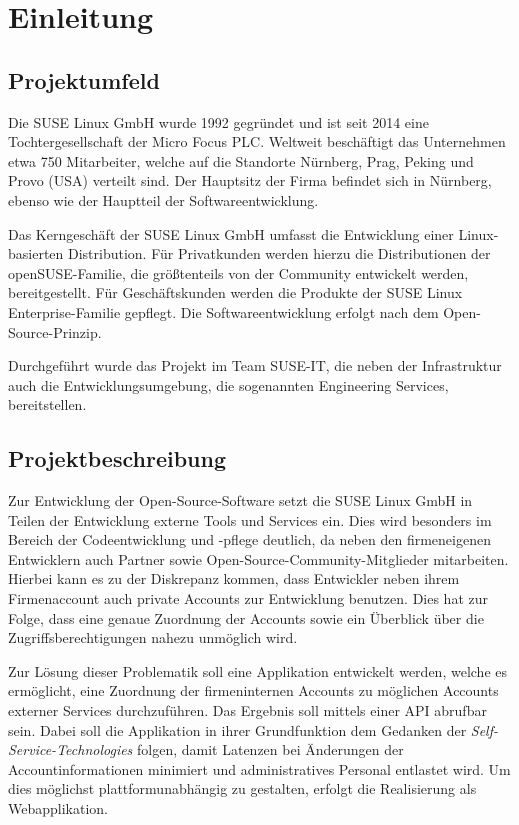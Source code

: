 \section{Einleitung}
\label{sec:Einleitung}

\subsection{Projektumfeld}
\label{sec:Projektumfeld}
Die SUSE Linux GmbH wurde 1992 gegründet und ist seit 2014 eine Tochtergesellschaft der Micro Focus
PLC. Weltweit beschäftigt das Unternehmen etwa 750 Mitarbeiter, welche auf die Standorte Nürnberg,
Prag, Peking und Provo (USA) verteilt sind. Der Hauptsitz der Firma befindet sich in Nürnberg,
ebenso wie der Hauptteil der Softwareentwicklung.

Das Kerngeschäft der SUSE Linux GmbH umfasst die Entwicklung einer Linux-basierten Distribution.
Für Privatkunden werden hierzu die Distributionen der openSUSE-Familie, die größtenteils von der
Community entwickelt werden, bereitgestellt. Für Geschäftskunden werden die Produkte der SUSE Linux
Enterprise-Familie gepflegt. Die Softwareentwicklung erfolgt nach dem Open-Source-Prinzip.

Durchgeführt wurde das Projekt im Team SUSE-IT, die neben der Infrastruktur auch die
Entwicklungsumgebung, die sogenannten Engineering Services, bereitstellen.

\subsection{Projektbeschreibung}
\label{sec:Projektbeschreibung}
Zur Entwicklung der Open-Source-Software setzt die SUSE Linux GmbH in Teilen der Entwicklung
externe Tools und Services ein. Dies wird besonders im Bereich der Codeentwicklung und -pflege
deutlich, da neben den firmeneigenen Entwicklern auch Partner sowie Open-Source-Community-Mitglieder
mitarbeiten. Hierbei kann es zu der Diskrepanz kommen, dass Entwickler neben ihrem Firmenaccount
auch private Accounts zur Entwicklung benutzen. Dies hat zur Folge, dass eine genaue Zuordnung
der Accounts sowie ein Überblick über die Zugriffsberechtigungen nahezu unmöglich wird.

Zur Lösung dieser Problematik soll eine Applikation entwickelt werden, welche es ermöglicht,
eine Zuordnung der firmeninternen Accounts zu möglichen Accounts externer Services durchzuführen.
Das Ergebnis soll mittels einer \acs{API} abrufbar sein.
Dabei soll die Applikation in ihrer Grundfunktion dem Gedanken der \textit{Self-Service-Technologies} folgen,
damit Latenzen bei Änderungen der Accountinformationen minimiert und administratives Personal
entlastet wird. Um dies möglichst plattformunabhängig zu gestalten, erfolgt die Realisierung als
Webapplikation.

